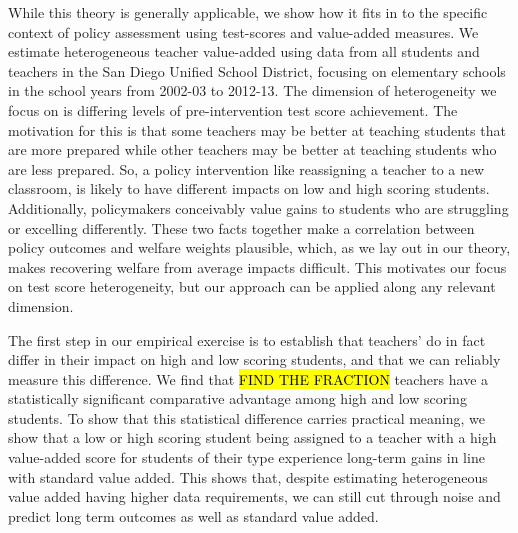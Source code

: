 \documentclass[12pt]{article}
\theoremstyle{definition}
\theoremstyle{definition}
\theoremstyle{definition}
\theoremstyle{definition}
\begin{document}
    
    While this theory is generally applicable, we show how it fits in to the specific context of policy assessment using test-scores and value-added measures. We estimate heterogeneous teacher value-added  using data from all students and teachers in the San Diego Unified School District, focusing on elementary schools in the school years from 2002-03 to 2012-13. The dimension of heterogeneity we focus on is differing levels of pre-intervention test score achievement. The motivation for this is that some teachers may be better at teaching students that are more prepared while other teachers may be better at teaching students who are less prepared. So, a policy intervention like reassigning a teacher to a new classroom, is likely to have different impacts on low and high scoring students. Additionally, policymakers conceivably value gains to students who are struggling or excelling differently. These two facts together make a correlation between policy outcomes and welfare weights plausible, which, as we lay out in our theory, makes recovering welfare from average impacts difficult. This motivates our focus on test score heterogeneity, but our approach can be applied along any relevant dimension. 
    

    The first step in our empirical exercise is to establish that teachers' do in fact differ in their impact on high and low scoring students, and that we can reliably measure this difference. We find that \hl{FIND THE FRACTION} teachers have a statistically significant comparative advantage among high and low scoring students. To show that this statistical difference carries practical meaning, we show that a low or high scoring student being assigned to a teacher with a high value-added score for students of their type experience long-term gains in line with standard value added. This shows that, despite estimating heterogeneous value added having higher data requirements, we can still cut through noise and predict long term outcomes as well as standard value added.
\end{document}
